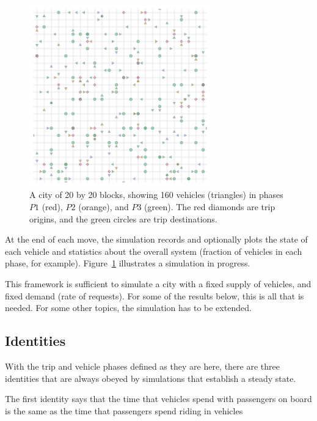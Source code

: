 \documentclass[
  letterpaper,
]{article}
\begin{document}
\begin{figure}

{\centering \includegraphics[width=0.7\textwidth,height=\textheight]{fig2.png}

}

\caption{\label{fig-2}A city of 20 by 20 blocks, showing 160 vehicles
(triangles) in phases \(P1\) (red), \(P2\) (orange), and \(P3\) (green).
The red diamonds are trip origins, and the green circles are trip
destinations.}

\end{figure}

At the end of each move, the simulation records and optionally plots the
state of each vehicle and statistics about the overall system (fraction
of vehicles in each phase, for example). Figure~\ref{fig-2} illustrates
a simulation in progress.

This framework is sufficient to simulate a city with a fixed supply of
vehicles, and fixed demand (rate of requests). For some of the results
below, this is all that is needed. For some other topics, the simulation
has to be extended.

\hypertarget{identities}{%
\subsection{Identities}\label{identities}}

With the trip and vehicle phases defined as they are here, there are
three identities that are always obeyed by simulations that establish a
steady state.

The first identity says that the time that vehicles spend with
passengers on board is the same as the time that passengers spend riding
in vehicles
\end{document}
